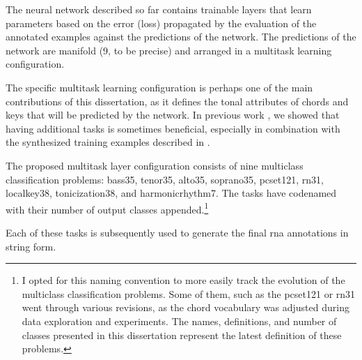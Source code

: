
The neural network described so far contains trainable
layers that learn parameters based on the error (loss)
propagated by the evaluation of the annotated examples
against the predictions of the network. The predictions of
the network are manifold (9, to be precise) and arranged in
a multitask learning configuration.

The specific multitask learning configuration is perhaps one
of the main contributions of this dissertation, as it
defines the tonal attributes of chords and keys that will be
predicted by the network. In previous work
\parencite{napoleslopez2021augmentednet}, we showed that
having additional tasks is sometimes beneficial, especially
in combination with the synthesized training examples
described in .

The proposed multitask layer configuration consists of nine
multiclass classification problems: \gls{bass35},
\gls{tenor35}, \gls{alto35}, \gls{soprano35},
\gls{pcset121}, \gls{rn31}, \gls{localkey38},
\gls{tonicization38}, and \gls{harmonicrhythm7}. The tasks
have codenamed with their number of output classes
appended.\footnote{I opted for this naming convention to
more easily track the evolution of the multiclass
classification problems. Some of them, such as the
\gls{pcset121} or \gls{rn31} went through various revisions,
as the chord vocabulary was adjusted during data exploration
and experiments. The names, definitions, and number of
classes presented in this dissertation represent the latest
definition of these problems.}

Each of these tasks is subsequently used to generate the
final \gls{rna} annotations in string form.
